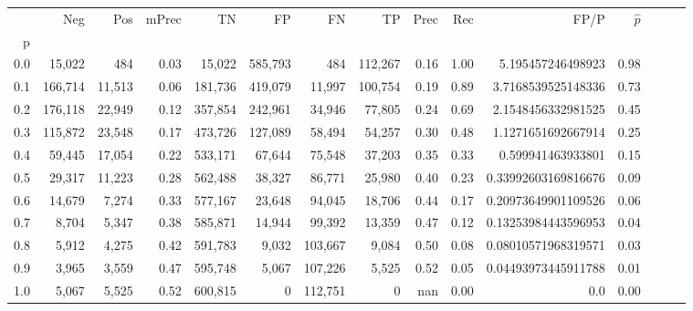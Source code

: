 \begin{tabular}{rrrrrrrrrrrrrrr}
\toprule
{} &      Neg &     Pos & mPrec &       TN &       FP &       FN &       TP &  Prec &   Rec &                 FP/P & $\hat{p}$ \\
p   &          &         &       &          &          &          &          &       &       &                      &           \\
\midrule
0.0 &   15,022 &     484 &  0.03 &   15,022 &  585,793 &      484 &  112,267 &  0.16 &  1.00 &    5.195457246498923 &      0.98 \\
0.1 &  166,714 &  11,513 &  0.06 &  181,736 &  419,079 &   11,997 &  100,754 &  0.19 &  0.89 &   3.7168539525148336 &      0.73 \\
0.2 &  176,118 &  22,949 &  0.12 &  357,854 &  242,961 &   34,946 &   77,805 &  0.24 &  0.69 &   2.1548456332981525 &      0.45 \\
0.3 &  115,872 &  23,548 &  0.17 &  473,726 &  127,089 &   58,494 &   54,257 &  0.30 &  0.48 &   1.1271651692667914 &      0.25 \\
0.4 &   59,445 &  17,054 &  0.22 &  533,171 &   67,644 &   75,548 &   37,203 &  0.35 &  0.33 &    0.599941463933801 &      0.15 \\
0.5 &   29,317 &  11,223 &  0.28 &  562,488 &   38,327 &   86,771 &   25,980 &  0.40 &  0.23 &  0.33992603169816676 &      0.09 \\
0.6 &   14,679 &   7,274 &  0.33 &  577,167 &   23,648 &   94,045 &   18,706 &  0.44 &  0.17 &  0.20973649901109526 &      0.06 \\
0.7 &    8,704 &   5,347 &  0.38 &  585,871 &   14,944 &   99,392 &   13,359 &  0.47 &  0.12 &  0.13253984443596953 &      0.04 \\
0.8 &    5,912 &   4,275 &  0.42 &  591,783 &    9,032 &  103,667 &    9,084 &  0.50 &  0.08 &  0.08010571968319571 &      0.03 \\
0.9 &    3,965 &   3,559 &  0.47 &  595,748 &    5,067 &  107,226 &    5,525 &  0.52 &  0.05 &  0.04493973445911788 &      0.01 \\
1.0 &    5,067 &   5,525 &  0.52 &  600,815 &        0 &  112,751 &        0 &   nan &  0.00 &                  0.0 &      0.00 \\
\bottomrule
\end{tabular}
